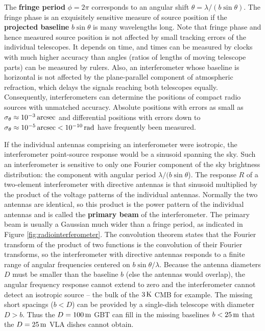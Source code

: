\documentclass[a4paper,10pt]{article}
\begin{document}
{\noindent}The \textbf{fringe period} $\phi=2\pi$ corresponds to an angular shift $\theta=\lambda/(b\sin\theta)$. The fringe phase is an exquisitely sensitive measure of source position if the \textbf{projected baseline} $b\sin\theta$ is many wavelengths long. Note that fringe phase and hence measured source position is not affected by small tracking errors of the individual telescopes. It depends on time, and times can be measured by clocks with much higher accuracy than angles (ratios of lengths of moving telescope parts) can be measured by rulers. Also, an interferometer whose baseline is horizontal is not affected by the plane-parallel component of atmospheric refraction, which delays the signals reaching both telescopes equally. Consequently, interferometers can determine the positions of compact radio sources with unmatched accuracy. Absolute positions with errors as small as $\sigma_\theta\approx10^{-3}\,{\rm arcsec}$ and differential positions with errors down to $\sigma_\theta\approx10^{-5}\,{\rm arcsec}<10^{-10}\,{\rm rad}$ have frequently been measured.

{\noindent}If the individual antennas comprising an interferometer were isotropic, the interferometer point-source response would be a sinusoid spanning the sky. Such an interferometer is sensitive to only one Fourier component of the sky brightness distribution: the component with angular period $\lambda/(b\sin\theta$). The response $R$ of a two-element interferometer with directive antennas is that sinusoid multiplied by the product of the voltage patterns of the individual antennas. Normally the two antennas are identical, so this product is the power pattern of the individual antennas and is called the \textbf{primary beam} of the interferometer. The primary beam is usually a Gaussian much wider than a fringe period, as indicated in Figure \ref{fig:radiointerferometer}. The convolution theorem states that the Fourier transform of the product of two functions is the convolution of their Fourier transforms, so the interferometer with directive antennas responds to a finite range of angular frequencies centered on $b\sin\theta/\lambda$. Because the antenna diameters $D$ must be smaller than the baseline $b$ (else the antennas would overlap), the angular frequency response cannot extend to zero and the interferometer cannot detect an isotropic source -- the bulk of the $3\,{\rm K}$ CMB for example. The missing short spacings ($b<D$) can be provided by a single-dish telescope with diameter $D>b$. Thus the $D=100\,{\rm m}$ GBT can fill in the missing baselines $b<25\,{\rm m}$ that the $D=25\,{\rm m}$ VLA dishes cannot obtain.
\end{document}
